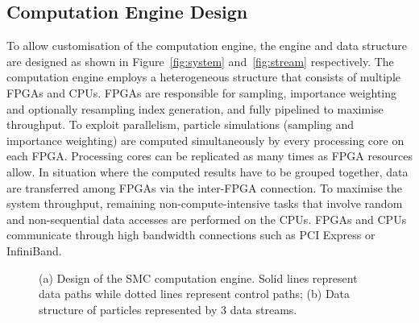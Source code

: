 \subsection{Computation Engine Design}
\label{sec:system}

To allow customisation of the computation engine, the engine and data structure are designed as shown in Figure~\ref{fig:system} and~\ref{fig:stream} respectively.
The computation engine employs a heterogeneous structure that consists of multiple FPGAs and CPUs.
FPGAs are responsible for sampling, importance weighting and optionally resampling index generation, and fully pipelined to maximise throughput. 
To exploit parallelism, particle simulations (sampling and importance weighting) are computed simultaneously by every processing core on each FPGA. 
Processing cores can be replicated as many times as FPGA resources allow.
In situation where the computed results have to be grouped together, data are transferred among FPGAs via the inter-FPGA connection.
To maximise the system throughput, remaining non-compute-intensive tasks that involve random and non-sequential data accesses are performed on the CPUs.
FPGAs and CPUs communicate through high bandwidth connections such as PCI Express or InfiniBand.

\setcounter{subfigure}{0}
\begin{figure}[t!]
\centering
{}
\caption{(a) Design of the SMC computation engine. Solid lines represent data paths while dotted lines represent control paths; (b) Data structure of particles represented by 3 data streams.}
\end{figure}

